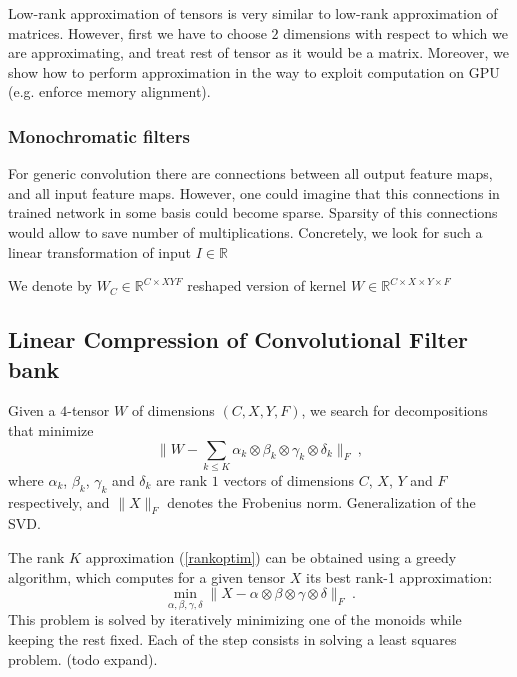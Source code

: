 \documentclass{article}
\begin{document}
Low-rank approximation of tensors is very similar to low-rank approximation of matrices.
However, first we have to choose $2$ dimensions with respect to which we are approximating, and treat
rest of tensor as it would be a matrix. Moreover, we show how to perform approximation in the way to
exploit computation on GPU (e.g. enforce memory alignment).


\subsubsection{Monochromatic filters}
For generic convolution there are connections between all output feature maps, and all input feature maps.
However, one could imagine that this connections in trained network in some basis could become sparse. 
Sparsity of this connections would allow to save number of multiplications. Concretely, we look for such a 
linear transformation of input $I \in \mathbb{R}$ 




We denote by $W_C \in \mathbb{R}^{C \times XYF}$ reshaped version of kernel $W \in \mathbb{R}^{C \times X \times Y \times F}$


\subsection{Linear Compression of Convolutional Filter bank}

Given a $4$-tensor $W$ of dimensions $(C,X,Y,F)$, we search for decompositions 
that minimize 
\begin{equation}
\label{rankoptim}
\| W - \sum_{k\leq K} \alpha_k \otimes \beta_k \otimes \gamma_k \otimes \delta_k\|_F~,
\end{equation}
where $\alpha_k$, $\beta_k$, $\gamma_k$ and $\delta_k$ are 
rank $1$ vectors of dimensions $C$, $X$, $Y$ and $F$ respectively, and
$\| X \|_F$ denotes the Frobenius norm. Generalization of the SVD.

The rank $K$ approximation (\ref{rankoptim}) can be obtained using a greedy 
algorithm, which computes for a given tensor $X$ its best rank-1 approximation:
\begin{equation}
\label{pla}
\min_{\alpha, \beta, \gamma, \delta} \| X - \alpha \otimes \beta \otimes \gamma \otimes \delta \|_F ~.
\end{equation}
This problem is solved by iteratively minimizing one of the monoids while keeping 
the rest fixed. Each of the step consists in solving a least squares problem. (todo expand).
\end{document}
